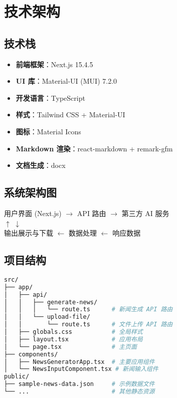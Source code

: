 \documentclass[a4paper, 12pt]{article}
\begin{document}
\section{技术架构}

\subsection{技术栈}
\begin{itemize}
    \item \textbf{前端框架}：Next.js 15.4.5
    \item \textbf{UI 库}：Material-UI (MUI) 7.2.0
    \item \textbf{开发语言}：TypeScript
    \item \textbf{样式}：Tailwind CSS + Material-UI
    \item \textbf{图标}：Material Icons
    \item \textbf{Markdown 渲染}：react-markdown + remark-gfm
    \item \textbf{文档生成}：docx
\end{itemize}

\subsection{系统架构图}
\begin{tcolorbox}[colback=blue!5,colframe=blue!40,title=系统架构图]
\centering
用户界面 (Next.js) $\longrightarrow$ API 路由 $\longrightarrow$ 第三方 AI 服务 \\
$\uparrow$ \hspace{6cm} $\downarrow$ \\
输出展示与下载 $\longleftarrow$ 数据处理 $\longleftarrow$ 响应数据
\end{tcolorbox}

\subsection{项目结构}
\begin{lstlisting}[language=bash, caption=项目文件结构]
src/
├── app/
│   ├── api/
│   │   ├── generate-news/
│   │   │   └── route.ts      # 新闻生成 API 路由
│   │   └── upload-file/
│   │       └── route.ts      # 文件上传 API 路由
│   ├── globals.css           # 全局样式
│   ├── layout.tsx            # 应用布局
│   └── page.tsx              # 主页面
├── components/
│   ├── NewsGeneratorApp.tsx  # 主要应用组件
│   └── NewsInputComponent.tsx # 新闻输入组件
public/
├── sample-news-data.json     # 示例数据文件
└── ...                       # 其他静态资源
\end{lstlisting}
\end{document}
